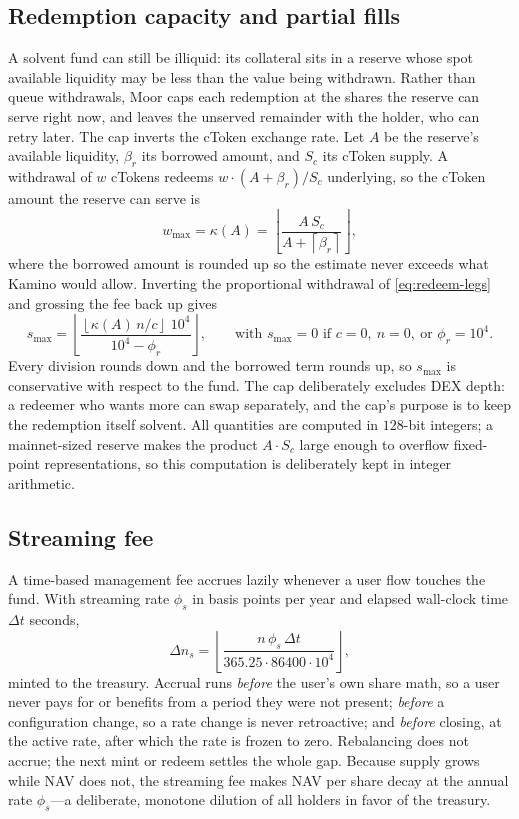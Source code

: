 \documentclass[11pt]{article}
\theoremstyle{remark}
\newcommand{\fl}[1]{\left\lfloor #1 \right\rfloor}
\newcommand{\cl}[1]{\left\lceil #1 \right\rceil}
\newcommand{\BPS}{10^{4}}
\begin{document}
\subsection{Redemption capacity and partial fills}
\label{sec:servable}

A solvent fund can still be illiquid: its collateral sits in a reserve whose spot available liquidity may be less than the value being withdrawn. Rather than queue withdrawals, Moor caps each redemption at the shares the reserve can serve right now, and leaves the unserved remainder with the holder, who can retry later. The cap inverts the cToken exchange rate. Let $A$ be the reserve's available liquidity, $\beta_r$ its borrowed amount, and $S_c$ its cToken supply. A withdrawal of $w$ cTokens redeems $w \cdot (A + \beta_r)/S_c$ underlying, so the cToken amount the reserve can serve is
\begin{equation}
w_{\max} = \kappa(A) = \fl{\frac{A\,S_c}{A + \cl{\beta_r}}},
\label{eq:ctoken-rate}
\end{equation}
where the borrowed amount is rounded up so the estimate never exceeds what Kamino would allow. Inverting the proportional withdrawal of \eqref{eq:redeem-legs} and grossing the fee back up gives
\begin{equation}
s_{\max} = \fl{\frac{\fl{\kappa(A)\,n / c}\;\BPS}{\BPS - \phi_r}},
\qquad
\text{with } s_{\max} = 0 \text{ if } c=0,\ n=0,\ \text{or } \phi_r = \BPS.
\label{eq:servable}
\end{equation}
Every division rounds down and the borrowed term rounds up, so $s_{\max}$ is conservative with respect to the fund. The cap deliberately excludes DEX depth: a redeemer who wants more can swap separately, and the cap's purpose is to keep the redemption itself solvent. All quantities are computed in $128$-bit integers; a mainnet-sized reserve makes the product $A \cdot S_c$ large enough to overflow fixed-point representations, so this computation is deliberately kept in integer arithmetic.

\subsection{Streaming fee}

A time-based management fee accrues lazily whenever a user flow touches the fund. With streaming rate $\phi_s$ in basis points per year and elapsed wall-clock time $\Delta t$ seconds,
\begin{equation}
\Delta n_s = \fl{\frac{n\,\phi_s\,\Delta t}{365.25 \cdot 86400 \cdot \BPS}},
\label{eq:streaming}
\end{equation}
minted to the treasury. Accrual runs \emph{before} the user's own share math, so a user never pays for or benefits from a period they were not present; \emph{before} a configuration change, so a rate change is never retroactive; and \emph{before} closing, at the active rate, after which the rate is frozen to zero. Rebalancing does not accrue; the next mint or redeem settles the whole gap. Because supply grows while NAV does not, the streaming fee makes NAV per share decay at the annual rate $\phi_s$---a deliberate, monotone dilution of all holders in favor of the treasury.
\end{document}
